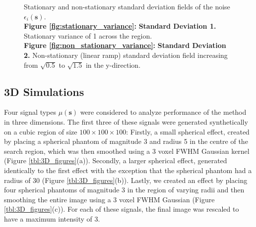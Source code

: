 \begin{figure}[htbp]
\label{fig:2D_variances}
\centering
{}
\caption{Stationary and non-stationary standard deviation fields of the noise $\epsilon_{i}(\bm{s})$. \\ \textbf{Figure \ref{fig:stationary_variance}:} \textbf{Standard Deviation 1.} Stationary variance of 1 across the region. \\ \textbf{Figure \ref{fig:non_stationary_variance}:} \textbf{Standard Deviation 2.} Non-stationary (linear ramp) standard deviation field increasing from $\sqrt{0.5}$ to $\sqrt{1.5}$ in the y-direction.}
\end{figure}

\subsection{3D Simulations}
\label{sec:3D_simulations}

Four signal types $\mu(\bm{s})$ were considered to analyze performance of the method in three dimensions. The first three of these signals were generated synthetically on a cubic region of size $100 \times 100 \times 100$: Firstly, a small spherical effect, created by placing a spherical phantom of magnitude 3 and radius 5 in the centre of the search region, which was then smoothed using a 3 voxel FWHM Gaussian kernel (Figure \ref{tbl:3D_figures}(a)). Secondly, a larger spherical effect, generated identically to the first effect with the exception that the spherical phantom had a radius of 30 (Figure \ref{tbl:3D_figures}(b)). Lastly, we created an effect by placing four spherical phantoms of magnitude 3 in the region of varying radii and then smoothing the entire image using a 3 voxel FWHM Gaussian (Figure \ref{tbl:3D_figures}(c)). For each of these signals, the final image was rescaled to have a maximum intensity of 3.

